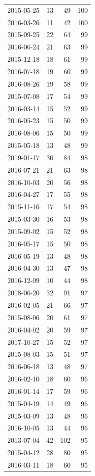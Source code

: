 \begin{tabular}{lrrr}
2015-05-25 & 13 & 49 & 100 \\
2016-03-26 & 11 & 42 & 100 \\
2015-09-25 & 22 & 64 & 99 \\
2016-06-24 & 21 & 63 & 99 \\
2015-12-18 & 18 & 61 & 99 \\
2016-07-18 & 19 & 60 & 99 \\
2016-08-26 & 19 & 58 & 99 \\
2015-07-08 & 17 & 54 & 99 \\
2016-03-14 & 15 & 52 & 99 \\
2016-05-23 & 15 & 50 & 99 \\
2016-08-06 & 15 & 50 & 99 \\
2015-05-18 & 13 & 48 & 99 \\
2019-01-17 & 30 & 84 & 98 \\
2016-07-21 & 21 & 63 & 98 \\
2016-10-03 & 20 & 56 & 98 \\
2016-04-27 & 17 & 55 & 98 \\
2015-11-16 & 17 & 54 & 98 \\
2015-03-30 & 16 & 53 & 98 \\
2015-09-02 & 15 & 52 & 98 \\
2016-05-17 & 15 & 50 & 98 \\
2016-05-19 & 13 & 48 & 98 \\
2016-04-30 & 13 & 47 & 98 \\
2016-12-09 & 10 & 44 & 98 \\
2018-06-20 & 32 & 91 & 97 \\
2016-02-05 & 21 & 66 & 97 \\
2015-08-06 & 20 & 61 & 97 \\
2016-04-02 & 20 & 59 & 97 \\
2017-10-27 & 15 & 52 & 97 \\
2015-08-03 & 15 & 51 & 97 \\
2016-06-18 & 13 & 48 & 97 \\
2016-02-10 & 18 & 60 & 96 \\
2016-01-14 & 17 & 59 & 96 \\
2015-04-19 & 14 & 49 & 96 \\
2015-03-09 & 13 & 48 & 96 \\
2016-10-05 & 13 & 44 & 96 \\
2013-07-04 & 42 & 102 & 95 \\
2015-04-12 & 28 & 80 & 95 \\
2016-03-11 & 18 & 60 & 95 \\

\end{tabular}
